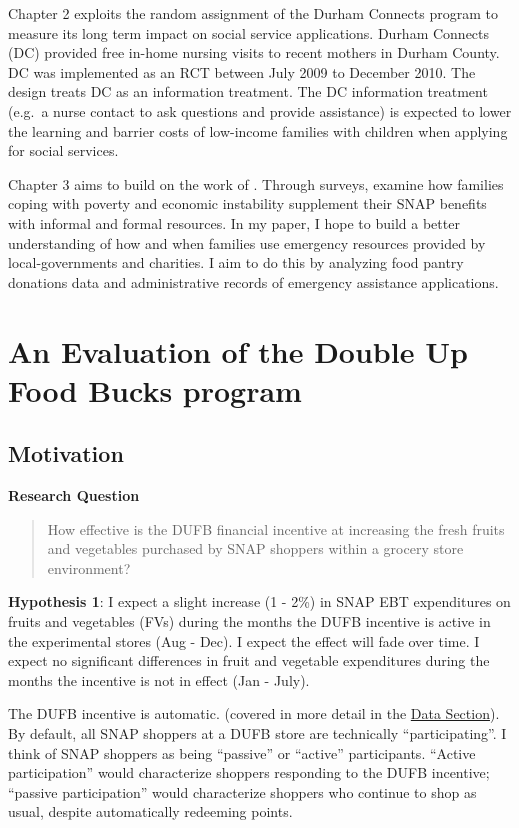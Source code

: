 \documentclass[12pt,letterpaperpaper,]{book}
\begin{document}
Chapter 2 exploits the random assignment of the Durham Connects program
to measure its long term impact on social service applications. Durham
Connects (DC) provided free in-home nursing visits to recent mothers in
Durham County. DC was implemented as an RCT between July 2009 to
December 2010. The design treats DC as an information treatment. The DC
information treatment (e.g.~a nurse contact to ask questions and provide
assistance) is expected to lower the learning and barrier costs of
low-income families with children when applying for social services.

Chapter 3 aims to build on the work of
\citet{schenck-fontaine_use_2016}. Through surveys,
\citet{schenck-fontaine_use_2016} examine how families coping with
poverty and economic instability supplement their SNAP benefits with
informal and formal resources. In my paper, I hope to build a better
understanding of how and when families use emergency resources provided
by local-governments and charities. I aim to do this by analyzing food
pantry donations data and administrative records of emergency assistance
applications.

\chapter{An Evaluation of the Double Up Food Bucks
program}\label{chapter-1}

\section*{Motivation}\label{motivation}

\textbf{Research Question}

\begin{quote}
How effective is the DUFB financial incentive at increasing the fresh
fruits and vegetables purchased by SNAP shoppers within a grocery store
environment?
\end{quote}

\textbf{Hypothesis 1}: I expect a slight increase (1 - 2\%) in SNAP EBT
expenditures on fruits and vegetables (FVs) during the months the DUFB
incentive is active in the experimental stores (Aug - Dec). I expect the
effect will fade over time. I expect no significant differences in fruit
and vegetable expenditures during the months the incentive is not in
effect (Jan - July).

The DUFB incentive is automatic. (covered in more detail in the
\protect\hyperlink{data-1}{Data Section}). By default, all SNAP shoppers
at a DUFB store are technically ``participating''. I think of SNAP
shoppers as being ``passive'' or ``active'' participants. ``Active
participation'' would characterize shoppers responding to the DUFB
incentive; ``passive participation'' would characterize shoppers who
continue to shop as usual, despite automatically redeeming points.
\end{document}
